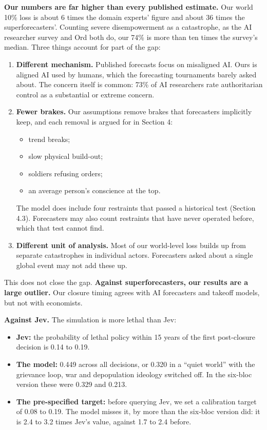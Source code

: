 \documentclass[
  10pt,
]{article}
\providecommand{\tightlist}{%
  \setlength{\itemsep}{0pt}\setlength{\parskip}{0pt}}
\begin{document}
\textbf{Our numbers are far higher than every published estimate.} Our world 10\% loss is about 6
times the domain experts' figure and about 36 times the superforecasters'. Counting severe
disempowerment as a catastrophe, as the AI researcher survey and Ord both do, our 74\% is more than
ten times the survey's median. Three things account for part of the gap:

\begin{enumerate}
\def\labelenumi{\arabic{enumi}.}
\tightlist
\item
  \textbf{Different mechanism.} Published forecasts focus on misaligned AI. Ours is aligned AI used
  by humans, which the forecasting tournaments barely asked about. The concern itself is common:
  73\% of AI researchers rate authoritarian control as a substantial or extreme concern.
\item
  \textbf{Fewer brakes.} Our assumptions remove brakes that forecasters implicitly keep, and each
  removal is argued for in Section 4:

  \begin{itemize}
  \tightlist
  \item
    trend breaks;
  \item
    slow physical build-out;
  \item
    soldiers refusing orders;
  \item
    an average person's conscience at the top.
  \end{itemize}

  The model does include four restraints that passed a historical test (Section 4.3). Forecasters
  may also count restraints that have never operated before, which that test cannot find.
\item
  \textbf{Different unit of analysis.} Most of our world-level loss builds up from separate
  catastrophes in individual actors. Forecasters asked about a single global event may not add these
  up.
\end{enumerate}

This does not close the gap. \textbf{Against superforecasters, our results are a large outlier.} Our
closure timing agrees with AI forecasters and takeoff models, but not with economists.

\textbf{Against Jev.} The simulation is more lethal than Jev:

\begin{itemize}
\tightlist
\item
  \textbf{Jev:} the probability of lethal policy within 15 years of the first post-closure decision
  is 0.14 to 0.19.
\item
  \textbf{The model:} 0.449 across all decisions, or 0.320 in a ``quiet world'' with the grievance
  loop, war and depopulation ideology switched off. In the six-bloc version these were 0.329 and
  0.213.
\item
  \textbf{The pre-specified target:} before querying Jev, we set a calibration target of 0.08 to
  0.19. The model misses it, by more than the six-bloc version did: it is 2.4 to 3.2 times Jev's
  value, against 1.7 to 2.4 before.
\end{itemize}
\end{document}
